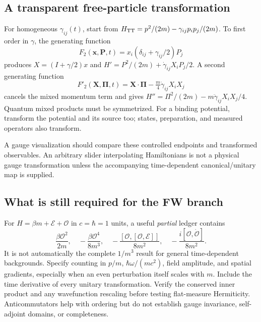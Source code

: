 \documentclass[a4paper,11pt]{article}
\begin{document}
\subsection{A transparent free-particle transformation}

For homogeneous $\gamma_{ij}(t)$, start from $H_{\rm TT}=p^2/(2m)-\gamma_{ij}p_ip_j/(2m)$. To first order in $\gamma$, the generating function
\begin{equation}
 F_2(\bm x,\bm P,t)=x_i(\delta_{ij}+\gamma_{ij}/2)P_j
\end{equation}
produces $X=(I+\gamma/2)x$ and $H'=P^2/(2m)+\dot\gamma_{ij}X_iP_j/2$. A second generating function
\begin{equation}
 F'_2(\bm X,\bm\Pi,t)=\bm X\cdot\bm\Pi-\tfrac m4\dot\gamma_{ij}X_iX_j
\end{equation}
cancels the mixed momentum term and gives $H''=\Pi^2/(2m)-m\ddot\gamma_{ij}X_iX_j/4$. Quantum mixed products must be symmetrized. For a binding potential, transform the potential and its source too; states, preparation, and measured operators also transform.

A gauge visualization should compare these controlled endpoints and transformed observables. An arbitrary slider interpolating Hamiltonians is not a physical gauge transformation unless the accompanying time-dependent canonical/unitary map is supplied.

\subsection{What is still required for the FW branch}

For $H=\beta m+\mathcal E+\mathcal O$ in $c=\hbar=1$ units, a useful \emph{partial} ledger contains
\begin{equation}
 \frac{\beta\mathcal O^2}{2m},\quad
 -\frac{\beta\mathcal O^4}{8m^3},\quad
 -\frac{[\mathcal O,[\mathcal O,\mathcal E]]}{8m^2},\quad
 -\frac{i[\mathcal O,\dot{\mathcal O}]}{8m^2}.
\end{equation}
It is not automatically the complete $1/m^3$ result for general time-dependent backgrounds. Specify counting in $p/m$, $\hbar\omega/(mc^2)$, field amplitude, and spatial gradients, especially when an even perturbation itself scales with $m$. Include the time derivative of every unitary transformation. Verify the conserved inner product and any wavefunction rescaling before testing flat-measure Hermiticity. Anticommutators help with ordering but do not establish gauge invariance, self-adjoint domains, or completeness.
\end{document}
